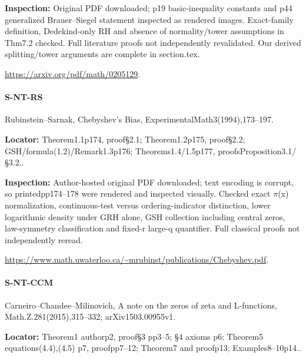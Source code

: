 \documentclass[11pt,a4paper]{article}
\begin{document}
\textbf{Inspection:} Original PDF downloaded; p19 basic-inequality constants and p44 generalized Brauer–\allowbreak{}Siegel statement inspected as rendered images.\allowbreak{} Exact-family definition, Dedekind-only RH and absence of normality/\allowbreak{}tower assumptions in Thm7.\allowbreak{}2 checked.\allowbreak{} Full literature proofs not independently revalidated.\allowbreak{} Our derived splitting/\allowbreak{}tower arguments are complete in section.\allowbreak{}tex.\allowbreak{}

\url{https://arxiv.org/pdf/math/0205129}.

\paragraph{S-NT-RS} Rubinstein–\allowbreak{}Sarnak, Chebyshev’s Bias, ExperimentalMath3(1994),173–\allowbreak{}197.

\textbf{Locator:} Theorem1.\allowbreak{}1p174, proof§2.\allowbreak{}1; Theorem1.\allowbreak{}2p175, proof§2.\allowbreak{}2; GSH/\allowbreak{}formula(1.\allowbreak{}2)/\allowbreak{}Remark1.\allowbreak{}3p176; Theorems1.\allowbreak{}4/\allowbreak{}1.\allowbreak{}5p177, proofsProposition3.\allowbreak{}1/\allowbreak{}§3.\allowbreak{}2.\allowbreak{}.

\textbf{Inspection:} Author-hosted original PDF downloaded; text encoding is corrupt, so printedpp174–\allowbreak{}178 were rendered and inspected visually.\allowbreak{} Checked exact \ensuremath{\pi}(x) normalization, continuous-test versus ordering-indicator distinction, lower logarithmic density under GRH alone, GSH collection including central zeros, law-symmetry classification and fixed-r large-q quantifier.\allowbreak{} Full classical proofs not independently reread.\allowbreak{}

\url{https://www.math.uwaterloo.ca/~mrubinst/publications/Chebyshev.pdf}.

\paragraph{S-NT-CCM} Carneiro–\allowbreak{}Chandee–\allowbreak{}Milinovich, A note on the zeros of zeta and L-functions, Math.\allowbreak{}Z.\allowbreak{}281(2015),315–\allowbreak{}332; arXiv1503.\allowbreak{}00955v1.

\textbf{Locator:} Theorem1 authorp2, proof§3 pp3–\allowbreak{}5; §4 axioms p6; Theorem5 equations(4.\allowbreak{}4),(4.\allowbreak{}5) p7, proofpp7–\allowbreak{}12; Theorem7 and proofp13; Examples8–\allowbreak{}10p14.\allowbreak{}.
\end{document}
